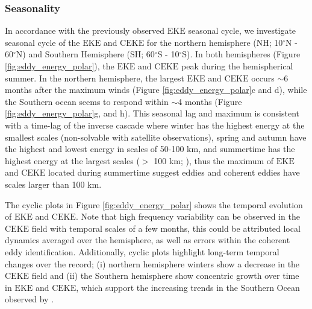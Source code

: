 \documentclass[draft,linenumbers]{agujournal2019}
\newcommand{\EKE}{\textrm{EKE}}
\newcommand{\CEKE}{\textrm{CEKE}}
\begin{document}
	\subsubsection{Seasonality}


	In accordance with the previously observed $\EKE$ seasonal cycle, we investigate seasonal cycle of the $\EKE$ and $\CEKE$ for the northern hemisphere (NH; 10$^\circ$N - 60$^\circ$N) and Southern Hemisphere (SH; 60$^\circ$S - 10$^\circ$S). 
	In both hemispheres (Figure \ref{fig:eddy_energy_polar}), the $\EKE$ and $\CEKE$ peak during the hemispherical summer. In the northern hemisphere, the largest $\EKE$ and $\CEKE$ occurs $\sim$6 months after the maximum winds (Figure \ref{fig:eddy_energy_polar}c and d), while the Southern ocean seems to respond within $\sim$4 months (Figure \ref{fig:eddy_energy_polar}g, and h). This seasonal lag and maximum is consistent with a time-lag of the inverse cascade \citep{Sasaki_seasonal_2014, Qiu_seasonal_2014} where winter has the highest energy at the smallest scales (non-solvable with satellite observations), spring and autumn have the highest and lowest energy in scales of 50-100 km, and summertime has the highest energy at the largest scales ($>$ 100 km; \citealt{Uchida_Seasonality_2017}), thus the maximum of $\EKE$ and $\CEKE$ located during summertime suggest eddies and coherent eddies have scales larger than 100 km.

	The cyclic plots in Figure \ref{fig:eddy_energy_polar} shows the temporal evolution of $\EKE$ and $\CEKE$. 
	Note that high frequency variability can be observed in the $\CEKE$ field with temporal scales of a few months, this could be attributed local dynamics averaged over the hemisphere, as well as errors within the coherent eddy identification. 
	Additionally, cyclic plots highlight long-term temporal changes over the record; (i) northern hemisphere winters show a decrease in the $\CEKE$ field and (ii) the Southern hemisphere show concentric growth over time in $\EKE$ and $\CEKE$, which support the increasing trends in the Southern Ocean observed by \citep{Hogg_Recent_2015,Martinez_TKE_2019,Martinez_Kinetic_2021}. 
\end{document}
